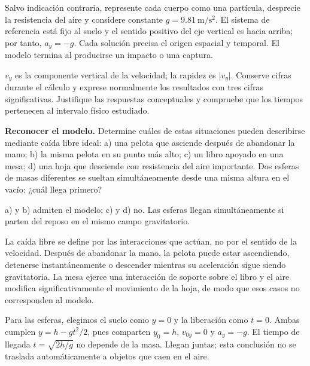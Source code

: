 \begin{condicion}
Salvo indicación contraria, represente cada cuerpo como una partícula, desprecie la resistencia del aire y considere constante \(g=\SI{9.81}{\meter\per\second\squared}\). El sistema de referencia está fijo al suelo y el sentido positivo del eje vertical es hacia arriba; por tanto, \(a_y=-g\). Cada solución precisa el origen espacial y temporal. El modelo termina al producirse un impacto o una captura.

\(v_y\) es la componente vertical de la velocidad; la rapidez es \(\lvert v_y\rvert\). Conserve cifras durante el cálculo y exprese normalmente los resultados con tres cifras significativas. Justifique las respuestas conceptuales y compruebe que los tiempos pertenecen al intervalo físico estudiado.
\end{condicion}

\nivelbasico

\begin{ejercicio}
\textbf{Reconocer el modelo.} Determine cuáles de estas situaciones pueden describirse mediante caída libre ideal: a) una pelota que asciende después de abandonar la mano; b) la misma pelota en su punto más alto; c) un libro apoyado en una mesa; d) una hoja que desciende con resistencia del aire importante. Dos esferas de masas diferentes se sueltan simultáneamente desde una misma altura en el vacío: ¿cuál llega primero?
\end{ejercicio}
\begin{respuesta}
a) y b) admiten el modelo; c) y d) no. Las esferas llegan simultáneamente si parten del reposo en el mismo campo gravitatorio.
\end{respuesta}
\begin{explicacion}
La caída libre se define por las interacciones que actúan, no por el sentido de la velocidad. Después de abandonar la mano, la pelota puede estar ascendiendo, detenerse instantáneamente o descender mientras su aceleración sigue siendo gravitatoria. La mesa ejerce una interacción de soporte sobre el libro y el aire modifica significativamente el movimiento de la hoja, de modo que esos casos no corresponden al modelo.

Para las esferas, elegimos el suelo como \(y=0\) y la liberación como \(t=0\). Ambas cumplen \(y=h-gt^2/2\), pues comparten \(y_0=h\), \(v_{0y}=0\) y \(a_y=-g\). El tiempo de llegada \(t=\sqrt{2h/g}\) no depende de la masa. Llegan juntas; esta conclusión no se traslada automáticamente a objetos que caen en el aire.
\end{explicacion}


